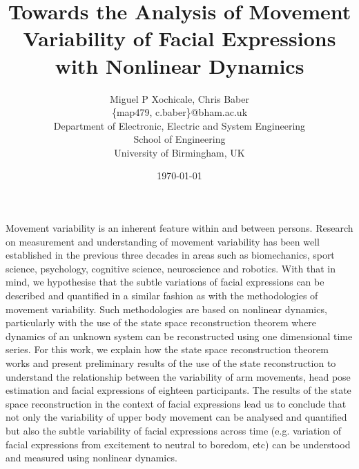 \documentclass[12pt]{article}
\author{Miguel P Xochicale, Chris Baber \\
\{map479, c.baber\}@bham.ac.uk \\
Department of Electronic, Electric and System Engineering\\
School of Engineering\\
University of Birmingham, UK}
\title{Towards the Analysis of Movement Variability of Facial Expressions with
Nonlinear Dynamics}
\date{\today}
\begin{document}
\maketitle

Movement variability is an inherent feature within and between persons.
Research on measurement and understanding of movement variability has been well
established in the previous three decades in areas such as biomechanics,
sport science, psychology, cognitive science, neuroscience and robotics.
With that in mind, we hypothesise that the subtle variations of facial expressions
can be described and quantified in a similar fashion as with the methodologies
of movement variability.
Such methodologies are based on nonlinear dynamics, particularly with the use of
the state space reconstruction theorem where dynamics of an unknown system
can be reconstructed using one dimensional time series.
For this work, we explain how the state space reconstruction theorem works and
present preliminary results of the use of the state reconstruction
to understand the relationship between the variability of arm movements, head
pose estimation and facial expressions of eighteen participants.
The results of the state space reconstruction in the context of facial expressions
lead us to conclude that not only the variability of upper body movement can be
analysed and quantified but also the subtle variability of facial expressions
across time (e.g. variation of facial expressions from excitement to neutral to boredom, etc)
can be understood and measured using nonlinear dynamics.
\end{document}
